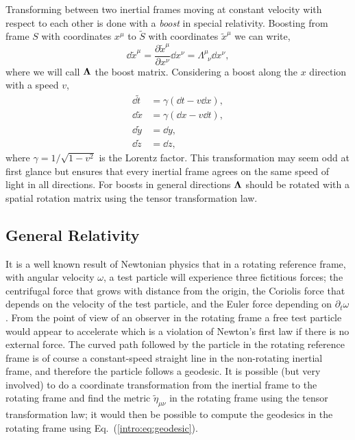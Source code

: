 Transforming between two inertial frames moving at constant velocity with respect to each other is done with a {\it boost} in special relativity. Boosting from frame $S$ with coordinates $x^\mu$ to $\tilde{S}$ with coordinates $\tilde{x}^\mu$ we can write,
\begin{equation}
\dd \tilde{x}^\mu = \frac{\partial \tilde{x}^\mu}{\partial x^\nu} \dd x^\nu = \Lambda^\mu_{\,\,\,\nu} \dd x^\nu,
\end{equation}
where we will call $\boldsymbol{\Lambda}$ the boost matrix. Considering a boost along the $x$ direction with a speed $v$,
\begin{align}
\dd \tilde{t} &= \gamma (\dd t-v\dd x), \\
\dd \tilde{x} &= \gamma (\dd x-v\dd t), \\
\dd \tilde{y} &= \dd y, \\
\dd \tilde{z} &= \dd z,
\end{align}
where $\gamma = 1/\sqrt{1-v^2}$ is the Lorentz factor. This transformation may seem odd at first glance but ensures that every inertial frame agrees on the same speed of light in all directions. For boosts in general directions $\boldsymbol{\Lambda}$ should be rotated with a spatial rotation matrix using the tensor transformation law.



\subsection{General Relativity}

It is a well known result of Newtonian physics that in a rotating reference frame, with angular velocity $\omega$, a test particle will experience three fictitious forces; the centrifugal force that grows with distance from the origin, the Coriolis force that depends on the velocity of the test particle, and the Euler force depending on $\partial_t \omega$. From the point of view of an observer in the rotating frame a free test particle would appear to accelerate which is a violation of Newton's first law if there is no external force. The curved path followed by the particle in the rotating reference frame is of course a constant-speed straight line in the non-rotating inertial frame, and therefore the particle follows a geodesic. It is possible (but very involved) to do a coordinate transformation from the inertial frame to the rotating frame and find the metric $\tilde{\eta}_{\mu\nu}$ in the rotating frame using the tensor transformation law; it would then be possible to compute the geodesics in the rotating frame using Eq.~(\ref{intro:eq:geodesic}).

